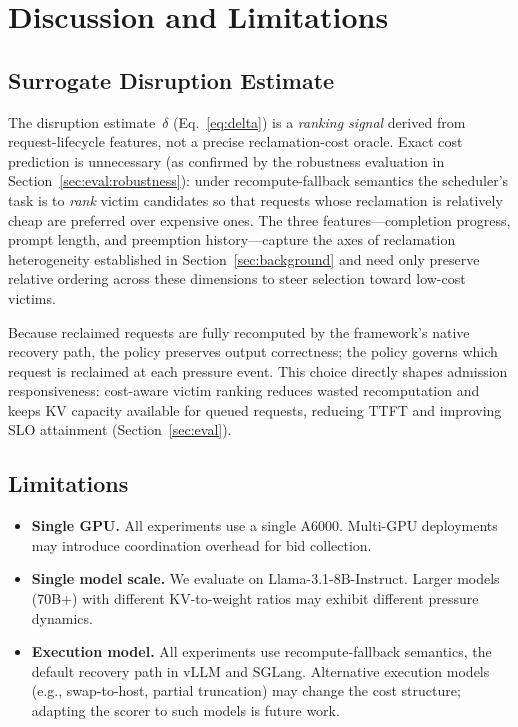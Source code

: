 \documentclass[sigconf,nonacm]{acmart}
\newcommand{\qualdelta}{\ensuremath{\delta}}
\begin{document}
\section{Discussion and Limitations}\label{sec:discussion}

\subsection{Surrogate Disruption Estimate}\label{sec:discuss:surrogate}

The disruption estimate~$\qualdelta$ (Eq.~\ref{eq:delta}) is a
\emph{ranking signal} derived from request-lifecycle features, not a precise
reclamation-cost oracle.  Exact cost prediction is unnecessary (as confirmed by the robustness evaluation in Section~\ref{sec:eval:robustness}): under
recompute-fallback semantics the scheduler's task is to \emph{rank} victim
candidates so that requests whose reclamation is relatively cheap are
preferred over expensive ones.  The three features---completion progress,
prompt length, and preemption history---capture the axes of reclamation
heterogeneity established in Section~\ref{sec:background} and need only
preserve relative ordering across these dimensions to steer selection
toward low-cost victims.

Because reclaimed requests are fully recomputed by the framework's native
recovery path, the policy preserves output correctness; the policy governs
which request is reclaimed at each pressure event.
This choice directly shapes admission responsiveness: cost-aware
victim ranking reduces wasted recomputation and keeps KV capacity available
for queued requests, reducing TTFT and improving SLO attainment
(Section~\ref{sec:eval}).

\subsection{Limitations}

\begin{itemize}[leftmargin=*,nosep]
\item \textbf{Single GPU.}  All experiments use a single A6000.  Multi-GPU
  deployments may introduce coordination overhead for bid collection.
\item \textbf{Single model scale.}  We evaluate on Llama-3.1-8B-Instruct.
  Larger models (70B+) with different KV-to-weight ratios may exhibit
  different pressure dynamics.
\item \textbf{Execution model.}  All experiments use recompute-fallback
  semantics, the default recovery path in vLLM and SGLang.  Alternative
  execution models (e.g., swap-to-host, partial truncation) may change
  the cost structure; adapting the scorer to such models is future work.
\end{itemize}
\end{document}
